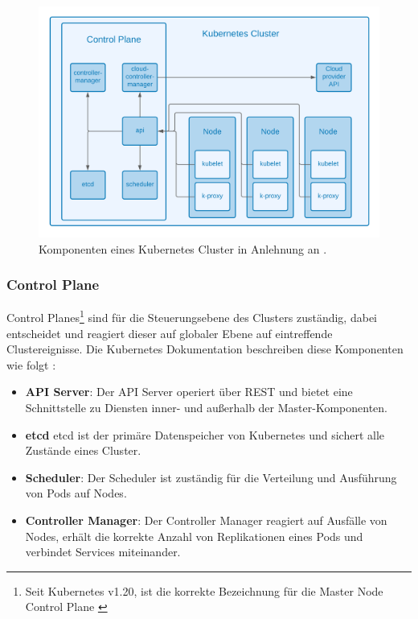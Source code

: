 \begin{figure}
    \centering
    \includegraphics[width=1.0\columnwidth]{images/KubernetesKomponenten.png}
    \caption{Komponenten eines Kubernetes Cluster in Anlehnung an \cite{kuberneteskomponenten}.}
    \label{fig:cluster}
\end{figure}

\subsubsection{Control Plane}
Control Planes\footnote{Seit Kubernetes v1.20, ist die korrekte Bezeichnung für die Master Node Control Plane \cite{Kuberneteschangemaster}} sind für die Steuerungsebene des Clusters zuständig,
dabei entscheidet und reagiert dieser auf globaler Ebene auf eintreffende Clustereignisse.
Die Kubernetes Dokumentation beschreiben diese Komponenten wie folgt \cite{kuberneteskomponenten}:

\begin{itemize}
  \item \textbf{API Server}: Der API Server operiert über REST und bietet eine Schnittstelle zu Diensten
  inner- und außerhalb der Master-Komponenten.
  \item \textbf{etcd} etcd ist der primäre Datenspeicher von Kubernetes und sichert alle Zustände eines Cluster.
  \item \textbf{Scheduler}: Der Scheduler ist zuständig für die Verteilung und Ausführung von Pods auf Nodes.
  \item \textbf{Controller Manager}: Der Controller Manager reagiert auf Ausfälle von Nodes, erhält die korrekte Anzahl von Replikationen eines Pods und verbindet Services miteinander.
\end{itemize}

